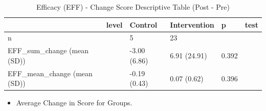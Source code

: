 \documentclass[
]{article}
\providecommand{\tightlist}{%
  \setlength{\itemsep}{0pt}\setlength{\parskip}{0pt}}
\begin{document}
\begin{longtable}[t]{llllll}
\caption{\label{tab:unnamed-chunk-11}Efficacy (EFF) - Change Score Descriptive Table (Post - Pre)}\\
\toprule
 & level & Control & Intervention & p & test\\
\midrule
n &  & 5 & 23 &  & \\
EFF\_sum\_change (mean (SD)) &  & -3.00 (6.86) & 6.91 (24.91) & 0.392 & \\
EFF\_mean\_change (mean (SD)) &  & -0.19 (0.43) & 0.07 (0.62) & 0.396 & \\
\bottomrule
\end{longtable}

\begin{itemize}
\tightlist
\item
  Average Change in Score for Groups.
\end{itemize}
\end{document}
